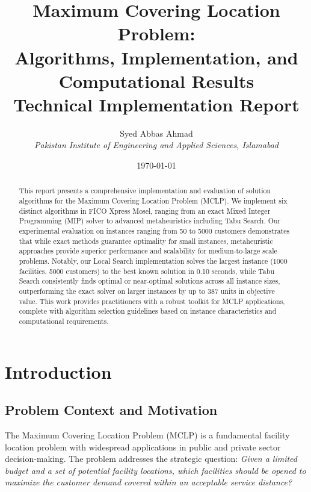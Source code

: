 \documentclass[11pt,a4paper]{article}
\title{
  \textbf{Maximum Covering Location Problem:}\\
  \textbf{Algorithms, Implementation, and Computational Results}\\
  \vspace{0.5cm}
  \large Technical Implementation Report
}
\author{
  Syed Abbas Ahmad\\
  \textit{Pakistan Institute of Engineering and Applied Sciences, Islamabad}
}
\date{\today}
\begin{document}
\maketitle

\begin{abstract}
This report presents a comprehensive implementation and evaluation of solution algorithms for the Maximum Covering Location Problem (MCLP). We implement six distinct algorithms in FICO Xpress Mosel, ranging from an exact Mixed Integer Programming (MIP) solver to advanced metaheuristics including Tabu Search. Our experimental evaluation on instances ranging from 50 to 5000 customers demonstrates that while exact methods guarantee optimality for small instances, metaheuristic approaches provide superior performance and scalability for medium-to-large scale problems. Notably, our Local Search implementation solves the largest instance (1000 facilities, 5000 customers) to the best known solution in 0.10 seconds, while Tabu Search consistently finds optimal or near-optimal solutions across all instance sizes, outperforming the exact solver on larger instances by up to 387 units in objective value. This work provides practitioners with a robust toolkit for MCLP applications, complete with algorithm selection guidelines based on instance characteristics and computational requirements.
\end{abstract}

\tableofcontents
\newpage

\section{Introduction}

\subsection{Problem Context and Motivation}

The Maximum Covering Location Problem (MCLP) is a fundamental facility location problem with widespread applications in public and private sector decision-making. The problem addresses the strategic question: \textit{Given a limited budget and a set of potential facility locations, which facilities should be opened to maximize the customer demand covered within an acceptable service distance?}
\end{document}
